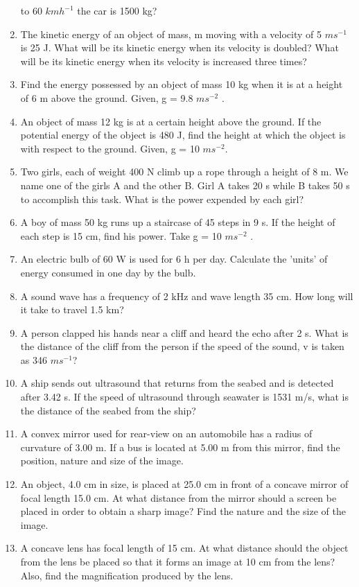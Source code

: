 \begin{enumerate}[label=\arabic*.,ref=\thesection.\theenumi]
to 60 $km h^{-1}$ the car is 1500 kg? 
\item  The kinetic energy of an object of mass, m moving with a velocity of 5 $m s^{-1}$
is 25 J. What will be its
kinetic energy when its velocity is doubled? What will be its kinetic energy when its velocity is increased three times?
\item   Find the energy possessed by an object of mass 10 kg when it is at a height of 6 m above the ground. Given, g = 9.8 $m s^{-2}$
.
\item  An object of mass 12 kg is at a certain height above the ground. If the potential energy of the object is 480 J, find the height at which the object is with respect to the ground. Given, g = 10 $m s^{-2}$.
\item  Two girls, each of weight 400 N climb up a rope through a height of 8 m. We name one of the girls A and the other B. Girl A takes 20 s while B takes 50 s to accomplish this task. What is the power expended by each girl?
\item  A boy of mass 50 kg runs up a staircase of 45 steps in 9 s. If the height of each step is 15 cm, find his power. Take g = 10 $m s^{-2}$
.
\item  An electric bulb of 60 W is used for 6 h per day. Calculate the 'units' of energy consumed in one day by the bulb.
\item  A sound wave has a frequency of 2 kHz and wave length 35 cm. How long will it take to travel 1.5 km?
\item  A person clapped his hands near a cliff and heard the echo after 2 s. What is the distance of the cliff from the person if the speed of the sound, v is taken as 346 $m s^{-1}$?
\item  A ship sends out ultrasound that returns from the seabed and is
detected after 3.42 s. If the speed of ultrasound through seawater is 1531 m/s, what is the distance of the seabed from the ship?
\item  A convex mirror used for rear-view on an automobile has a radius of curvature of 3.00 m. If a bus is located at 5.00 m from this mirror, find the position, nature and size of the image.
\item  An object, 4.0 cm in size, is placed at 25.0 cm in front of a concave mirror of focal length 15.0 cm. At what distance from the mirror should a screen be placed in order to obtain a sharp image? Find the nature and the size of the image.
\item  A concave lens has focal length of 15 cm. At what distance should the object from the lens be placed so that it forms an image at 10 cm from the lens? Also, find the magnification produced by the lens.

\end{enumerate}
